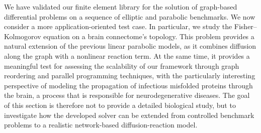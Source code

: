 We have validated our finite element library for the solution of graph-based differential problems on a sequence of elliptic and parabolic benchmarks. We now consider a more application-oriented test case. In particular, we study the Fisher–Kolmogorov equation on a brain connectome's topology. This problem provides a natural extension of the previous linear parabolic models, as it combines diffusion along the graph with a nonlinear reaction term. At the same time, it provides a meaningful test for assessing the scalability of our framework through graph reordering and parallel programming techniques, with the particularly interesting perspective of modeling the propagation of infectious misfolded proteins through the brain, a process that is responsible for neurodegenerative diseases. The goal of this section is therefore not to provide a detailed biological study, but to investigate how the developed solver can be extended from controlled benchmark problems to a realistic network-based diffusion-reaction model.




